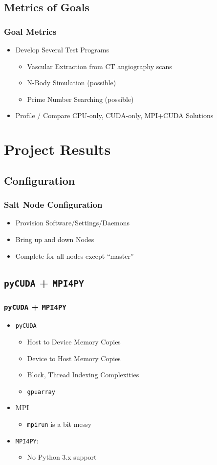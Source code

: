 \documentclass{beamer}
\begin{document}
\subsection{Metrics of Goals}
\begin{frame}
\frametitle{Goal Metrics}
\begin{itemize}
\item{Develop Several Test Programs}
\begin{itemize}
\item{Vascular Extraction from CT angiography scans}
\item{N-Body Simulation (possible)}
\item{Prime Number Searching (possible)}
\end{itemize}
\item{Profile / Compare CPU-only, CUDA-only, MPI+CUDA Solutions}
\end{itemize}
\end{frame}
\section{Project Results}
\subsection{Configuration}
\begin{frame}
\frametitle{Salt Node Configuration}
\begin{itemize}
\item{Provision Software/Settings/Daemons}
\item{Bring up and down Nodes}
\item{Complete for all nodes except ``master''}
\end{itemize}
\end{frame}
\subsection{\texttt{pyCUDA} + \texttt{MPI4PY}}
\begin{frame}
\frametitle{\texttt{pyCUDA} + \texttt{MPI4PY}}
\begin{itemize}
\item{\texttt{pyCUDA}}
\begin{itemize}
\item{Host to Device Memory Copies}
\item{Device to Host Memory Copies}
\item{Block, Thread Indexing Complexities}
\item{\texttt{gpuarray}}
\end{itemize}
\item{MPI}
\begin{itemize}
\item{\texttt{mpirun} is a bit messy}
\end{itemize}
\item{\texttt{MPI4PY}:}
\begin{itemize}
\item{No Python 3.x support}
\end{itemize}
\end{itemize}
\end{frame}
\end{document}
